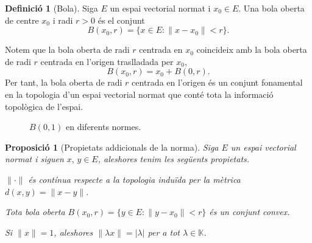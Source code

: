 \documentclass[12pt]{book}
\newtheorem{prop}[teorema]{Proposició}
\theoremstyle{definition}
\newtheorem{defi}[teorema]{Definició}
\theoremstyle{nota}
\theoremstyle{exemple}
\begin{document}
\begin{defi}[Bola]
  Siga $E$ un espai vectorial normat i $x_0 \in E$. Una bola oberta de
  centre $x_0$ i radi $r > 0$ és el conjunt
  \[
    B(x_0, r) = \{ x \in E : \|x - x_0\| < r \}.
  \]
\end{defi}

Notem que la bola oberta de radi $r$ centrada en $x_0$ coincideix amb
la bola oberta de radi $r$ centrada en l'origen traslladada per $x_0$,
\[
  B(x_0, r) = x_0 + B(0,r).
\]
Per tant, la bola oberta de radi $r$ centrada en l'origen és un
conjunt fonamental en la topologia d'un espai vectorial normat que
conté tota la informació topològica de l'espai.

\begin{figure}[htbp]
  \centering
  \caption{$B(0,1)$ en diferents normes.}
  \label{fig:bola-normes}
\end{figure}

\begin{prop}[Propietats addicionals de la norma]
  Siga $E$ un espai vectorial normat i siguen $x, \, y \in E$,
  aleshores tenim les següents propietats.
  \begin{description}[noitemsep]
  \item[Continuïtat] $\|\cdot\|$ és contínua respecte a la topologia
    induïda per la mètrica $d(x,y) = \|x - y\|$.
  \item[Convexitat de boles] Tota bola oberta
    $B(x_0, r) = \{y \in E : \|y - x_0\| < r\}$ és un conjunt convex.
  \item[Escalabilitat] Si $\|x\| = 1$, aleshores
    $\|\lambda x\| = |\lambda|$ per a tot $\lambda \in \mathbb{K}$.
  \end{description}
\end{prop}
\end{document}

